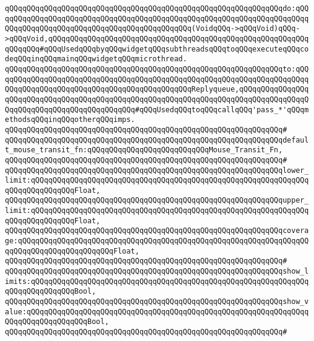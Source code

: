 \verb|qQQqqQQqqQQqqQQqqQQqqQQqqQQqqQQqqQQqqQQqqQQqqQQqqQQqqQQqqQQqqQQqdo:qQQqqQQqqQQqqQQqqQQqqQQqqQQqqQQqqQQqqQQqqQQqqQQqqQQqqQQqqQQqqQQqqQQqqQQqqQQqqQQqqQQqqQQqqQQqqQQqqQQqqQQqqQQqqQQqqQQq(VoidqQQq->qQQqVoid)qQQq->qQQqVoid,qQQqqQQqqQQqqQQqqQQqqQQqqQQqqQQqqQQqqQQqqQQqqQQqqQQqqQQqqQQqqQQqqQQq#qQQqUsedqQQqbyqQQqwidgetqQQqsubthreadsqQQqtoqQQqexecuteqQQqcodeqQQqinqQQqmainqQQqwidgetqQQqmicrothread.|\newline
\verb|qQQqqQQqqQQqqQQqqQQqqQQqqQQqqQQqqQQqqQQqqQQqqQQqqQQqqQQqqQQqqQQqto:qQQqqQQqqQQqqQQqqQQqqQQqqQQqqQQqqQQqqQQqqQQqqQQqqQQqqQQqqQQqqQQqqQQqqQQqqQQqqQQqqQQqqQQqqQQqqQQqqQQqqQQqqQQqqQQqqQQqReplyqueue,qQQqqQQqqQQqqQQqqQQqqQQqqQQqqQQqqQQqqQQqqQQqqQQqqQQqqQQqqQQqqQQqqQQqqQQqqQQqqQQqqQQqqQQqqQQqqQQqqQQqqQQqqQQqqQQqqQQq#qQQqUsedqQQqtoqQQqcallqQQq'pass_*'qQQqmethodsqQQqinqQQqotherqQQqimps.|\newline
\verb|qQQqqQQqqQQqqQQqqQQqqQQqqQQqqQQqqQQqqQQqqQQqqQQqqQQqqQQqqQQqqQQq#|\newline
\verb|qQQqqQQqqQQqqQQqqQQqqQQqqQQqqQQqqQQqqQQqqQQqqQQqqQQqqQQqqQQqqQQqdefault_mouse_transit_fn:qQQqqQQqqQQqqQQqqQQqqQQqqQQqMouse_Transit_Fn,|\newline
\verb|qQQqqQQqqQQqqQQqqQQqqQQqqQQqqQQqqQQqqQQqqQQqqQQqqQQqqQQqqQQqqQQq#|\newline
\verb|qQQqqQQqqQQqqQQqqQQqqQQqqQQqqQQqqQQqqQQqqQQqqQQqqQQqqQQqqQQqqQQqlower_limit:qQQqqQQqqQQqqQQqqQQqqQQqqQQqqQQqqQQqqQQqqQQqqQQqqQQqqQQqqQQqqQQqqQQqqQQqqQQqqQQqFloat,|\newline
\verb|qQQqqQQqqQQqqQQqqQQqqQQqqQQqqQQqqQQqqQQqqQQqqQQqqQQqqQQqqQQqqQQqupper_limit:qQQqqQQqqQQqqQQqqQQqqQQqqQQqqQQqqQQqqQQqqQQqqQQqqQQqqQQqqQQqqQQqqQQqqQQqqQQqqQQqFloat,|\newline
\verb|qQQqqQQqqQQqqQQqqQQqqQQqqQQqqQQqqQQqqQQqqQQqqQQqqQQqqQQqqQQqqQQqcoverage:qQQqqQQqqQQqqQQqqQQqqQQqqQQqqQQqqQQqqQQqqQQqqQQqqQQqqQQqqQQqqQQqqQQqqQQqqQQqqQQqqQQqqQQqqQQqFloat,|\newline
\verb|qQQqqQQqqQQqqQQqqQQqqQQqqQQqqQQqqQQqqQQqqQQqqQQqqQQqqQQqqQQqqQQq#|\newline
\verb|qQQqqQQqqQQqqQQqqQQqqQQqqQQqqQQqqQQqqQQqqQQqqQQqqQQqqQQqqQQqqQQqshow_limits:qQQqqQQqqQQqqQQqqQQqqQQqqQQqqQQqqQQqqQQqqQQqqQQqqQQqqQQqqQQqqQQqqQQqqQQqqQQqqQQqBool,|\newline
\verb|qQQqqQQqqQQqqQQqqQQqqQQqqQQqqQQqqQQqqQQqqQQqqQQqqQQqqQQqqQQqqQQqshow_value:qQQqqQQqqQQqqQQqqQQqqQQqqQQqqQQqqQQqqQQqqQQqqQQqqQQqqQQqqQQqqQQqqQQqqQQqqQQqqQQqqQQqBool,|\newline
\verb|qQQqqQQqqQQqqQQqqQQqqQQqqQQqqQQqqQQqqQQqqQQqqQQqqQQqqQQqqQQqqQQq#|\newline
